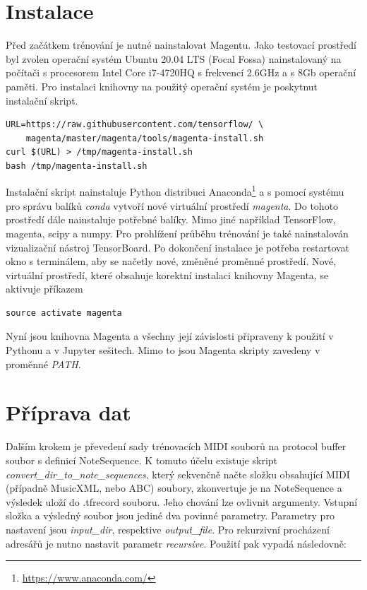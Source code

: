 \section{Instalace}
Před začátkem trénování je nutné nainstalovat Magentu.
Jako testovací prostředí byl zvolen operační systém Ubuntu 20.04 LTS (Focal Fossa)
nainstalovaný na počítači s procesorem Intel Core i7-4720HQ s frekvencí 2.6GHz
a s 8Gb operační paměti. 
Pro instalaci knihovny na použitý operační systém je poskytnut instalační skript.

\begin{verbatim}
URL=https://raw.githubusercontent.com/tensorflow/ \
    magenta/master/magenta/tools/magenta-install.sh
curl $(URL) > /tmp/magenta-install.sh
bash /tmp/magenta-install.sh    
\end{verbatim}

Instalační skript nainstaluje Python distribuci Anaconda\footnote{\url{https://www.anaconda.com/}}
a s pomocí systému pro správu balíků \emph{conda} vytvoří nové virtuální prostředí \emph{magenta}.
Do tohoto prostředí dále nainstaluje potřebné balíky.
Mimo jiné například TensorFlow, magenta, scipy a numpy.
Pro prohlížení průběhu trénování je také nainstalován vizualizační nástroj TensorBoard.
Po dokončení instalace je potřeba restartovat okno s terminálem,
aby se načetly nové, změněné proměnné prostředí.
Nové, virtuální prostředí, které obsahuje korektní instalaci knihovny Magenta,
se aktivuje příkazem

\begin{verbatim}
source activate magenta
\end{verbatim}

Nyní jsou knihovna Magenta a všechny její závislosti 
připraveny k použití v Pythonu a v Jupyter sešitech.
Mimo to jsou Magenta skripty zavedeny v proměnné \emph{PATH}.
\cite{google_git_polyphony}
\par

\section{Příprava dat}
Dalším krokem je převedení sady trénovacích MIDI souborů na protocol buffer soubor
s definicí NoteSequence.
K tomuto účelu existuje skript \emph{convert\_dir\_to\_note\_sequences}, 
který sekvenčně načte složku obsahující MIDI (případně MusicXML, nebo ABC) soubory,
zkonvertuje je na NoteSequence a výsledek uloží do .tfrecord souboru.
Jeho chování lze ovlivnit argumenty.
Vstupní složka a výsledný soubor jsou jediné dva povinné parametry.
Parametry pro nastavení jsou \emph{input\_dir}, respektive \emph{output\_file}.
Pro rekurzivní procházení adresářů je nutno nastavit parametr \emph{recursive}.
\cite{google_git_polyphony}
Použití  pak vypadá následovně:

